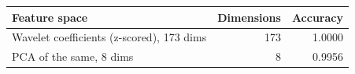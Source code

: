 \begin{tabular}{lrr}
\toprule
Feature space & Dimensions & Accuracy \\
\midrule
Wavelet coefficients (z-scored), 173 dims & 173 & 1.0000 \\
PCA of the same, 8 dims & 8 & 0.9956 \\
\bottomrule
\end{tabular}
